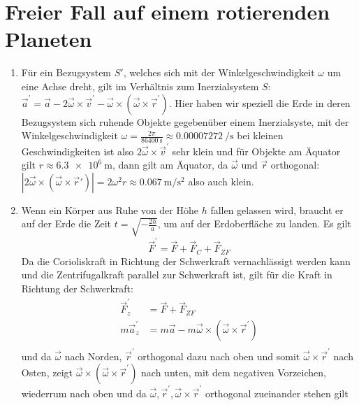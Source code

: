 \documentclass[sectionformat = aufgabe]{gadsescript}
\begin{document}
\maketitle

\section{Freier Fall auf einem rotierenden Planeten}
\begin{enumerate}[label=\alph*)]
	\item Für ein Bezugsystem $ S' $, welches sich mit der Winkelgeschwindigkeit $ \omega $ um eine Achse dreht, gilt im Verhältnis zum Inerzialsystem $ S $: $ \vec a^\prime = \vec a - 2 \vec \omega \times \vec v^\prime - \vec \omega \times ( \vec \omega \times \vec r^\prime ) $.
		Hier haben wir speziell die Erde in deren Bezugsystem sich ruhende Objekte gegebenüber einem Inerzialsyste,
		mit der Winkelgeschwindigkeit $ \omega = \frac{2\pi}{\qty{86400}{\second}} \approx \qty{0.00007272}{\per\second} $ bei kleinen Geschwindigkeiten ist also $ 2 \vec \omega \times \vec v ^\prime $ sehr klein und für Objekte am Äquator gilt $ r \approx \qty{6.3e6}{\metre} $,
		dann gilt am Äquator,
		da $ \vec \omega $ und $ \vec r $ orthogonal: $ | 2 \vec \omega \times ( \vec \omega \times \vec r' ) | = 2 \omega^2 r \approx \qty{0.067}{\metre\per\square\second} $ also auch klein.
	\item Wenn ein Körper aus Ruhe von der Höhe $ h $ fallen gelassen wird, braucht er auf der Erde die Zeit $ t = \sqrt{-\frac{2h}{a}} $, um auf der Erdoberfläche zu landen.
		Es gilt
		\[ \vec F^\prime = \vec F + \vec F_{C} + \vec F_{ZF} \]
		Da die Corioliskraft in Richtung der Schwerkraft vernachlässigt werden kann und die Zentrifugalkraft parallel zur Schwerkraft ist, gilt für die Kraft in Richtung der Schwerkraft:
		\begin{align*}
			\vec F_z^\prime &= \vec F + \vec F_{ZF}\\
			m\vec a_z^\prime &= m\vec a - m\vec \omega \times ( \vec \omega \times \vec r^\prime)\\
		\end{align*}
		und da $ \vec \omega $ nach Norden, $\vec r^\prime$ orthogonal dazu nach oben und somit $\vec \omega \times \vec r^\prime $ nach Osten, zeigt $ \vec \omega \times ( \vec \omega \times \vec r^\prime ) $ nach unten, mit dem negativen Vorzeichen, wiederrum nach oben und da $\vec \omega, \vec r^\prime, \vec \omega \times \vec r^\prime $ orthogonal zueinander stehen gilt
		\begin{align*}

\end{align*}
\end{enumerate}
\end{document}
